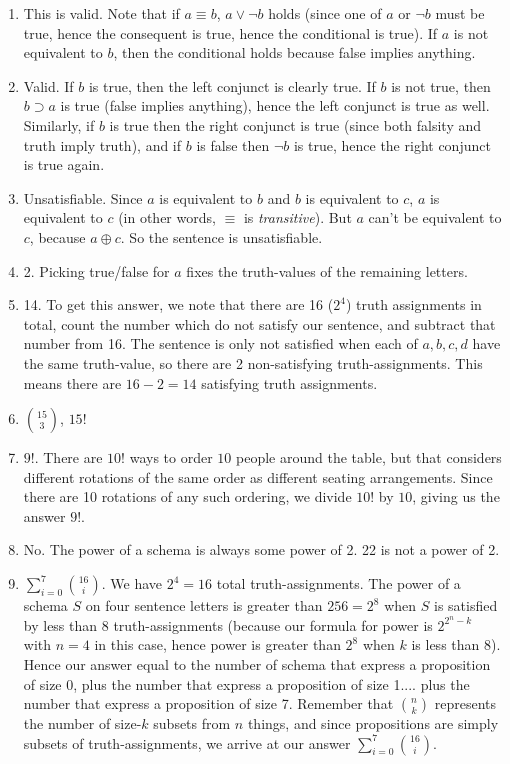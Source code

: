 \begin{mdframed}[linewidth=1]
\begin{enumerate}
    \item This is valid. Note that if $a \equiv b$, $a \vee \lnot b$ holds (since one of $a$ or $\lnot b$ must be true, hence the consequent is true, hence the conditional is true). If $a$ is not equivalent to $b$, then the conditional holds because false implies anything. 

    \item Valid. If $b$ is true, then the left conjunct is clearly true. If $b$ is not true, then $b \supset a$ is true (false implies anything), hence the left conjunct is true as well. Similarly, if $b$ is true then the right conjunct is true (since both falsity and truth imply truth), and if $b$ is false then $\lnot b$ is true, hence the right conjunct is true again. 

    \item Unsatisfiable. Since $a$ is equivalent to $b$ and $b$ is equivalent to $c$, $a$ is equivalent to $c$ (in other words, $\equiv$ is \emph{transitive}). But $a$ can't be equivalent to $c$, because $a \oplus c$. So the sentence is unsatisfiable. 

    \item 2. Picking true/false for $a$ fixes the truth-values of the remaining letters. 

    \item 14. To get this answer, we note that there are 16 ($2^4$) truth assignments in total, count the number which do not satisfy our sentence, and subtract that number from 16. The sentence is only not satisfied when each of $a, b, c, d$ have the same truth-value, so there are 2 non-satisfying truth-assignments. This means there are $16 - 2 = 14$ satisfying truth assignments. 

    \item $15 \choose 3$, $15!$

    \item $9!$. There are $10!$ ways to order $10$ people around the table, but that considers different rotations of the same order as different seating arrangements. Since there are 10 rotations of any such ordering, we divide $10!$ by $10$, giving us the answer $9!$.

    \item No. The power of a schema is always some power of 2. 22 is not a power of 2. 

    \item $\sum_{i = 0}^7{16 \choose i}$. We have $2^4 = 16$ total truth-assignments. The power of a schema $S$ on four sentence letters is greater than $256 = 2^8$ when $S$ is satisfied by less than $8$ truth-assignments (because our formula for power is $2^{2^n - k}$ with $n=4$ in this case, hence power is greater than $2^8$ when $k$ is less than 8). Hence our answer equal to the number of schema that express a proposition of size 0, plus the number that express a proposition of size 1.... plus the number that express a proposition of size 7. Remember that $n \choose k$ represents the number of size-$k$ subsets from $n$ things, and since propositions are simply subsets of truth-assignments, we arrive at our answer $\sum_{i = 0}^7{16 \choose i}$.


\end{enumerate}
\end{mdframed}
